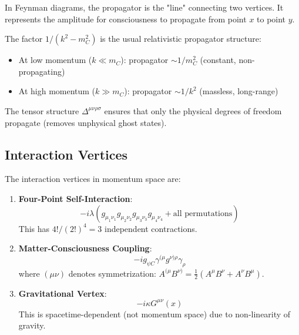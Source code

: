 \begin{intuitive}
In Feynman diagrams, the propagator is the "line" connecting two vertices. It represents the amplitude for consciousness to propagate from point $x$ to point $y$.

The factor $1/(k^2 - m_C^2)$ is the usual relativistic propagator structure:
\begin{itemize}
\item At low momentum ($k \ll m_C$): propagator $\sim 1/m_C^2$ (constant, non-propagating)
\item At high momentum ($k \gg m_C$): propagator $\sim 1/k^2$ (massless, long-range)
\end{itemize}

The tensor structure $\Delta^{\mu\nu\rho\sigma}$ ensures that only the physical degrees of freedom propagate (removes unphysical ghost states).
\end{intuitive}

\subsection{Interaction Vertices}

\begin{thm}\label{thm:feynman-rules}
The interaction vertices in momentum space are:

\begin{enumerate}
\item \textbf{Four-Point Self-Interaction}:
\begin{equation}
-i\lambda (g_{\mu_1\nu_1}g_{\mu_2\nu_2}g_{\mu_3\nu_3}g_{\mu_4\nu_4} + \text{all permutations})
\end{equation}
This has $4!/(2!)^4 = 3$ independent contractions.

\item \textbf{Matter-Consciousness Coupling}:
\begin{equation}
-ig_{\psi C}\gamma^{(\mu}g^{\nu)\rho}\gamma_\rho
\end{equation}
where $(\mu \nu)$ denotes symmetrization: $A^{(\mu}B^{\nu)} = \frac{1}{2}(A^\mu B^\nu + A^\nu B^\mu)$.

\item \textbf{Gravitational Vertex}:
\begin{equation}
-i\kappa G^{\mu\nu}(x)
\end{equation}
This is spacetime-dependent (not momentum space) due to non-linearity of gravity.
\end{enumerate}
\end{thm}

